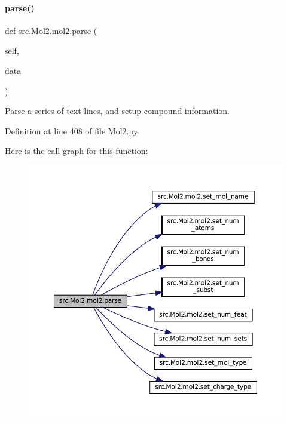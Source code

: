 \paragraph{\texorpdfstring{parse()}{parse()}}
{\footnotesize\ttfamily def src.\+Mol2.\+mol2.\+parse (\begin{DoxyParamCaption}\item[{}]{self,  }\item[{}]{data }\end{DoxyParamCaption})}



Parse a series of text lines, and setup compound information. 



Definition at line 408 of file Mol2.\+py.

Here is the call graph for this function\+:
\nopagebreak
\begin{figure}[H]
\begin{center}
\leavevmode
\includegraphics[width=350pt]{classsrc_1_1Mol2_1_1mol2_a3f8091dc58267dfc193486b80c247def_cgraph}
\end{center}
\end{figure}
\mbox{\label{classsrc_1_1Mol2_1_1mol2_a6aacaa8f96033fc7bad3080f48c5a992}} 
